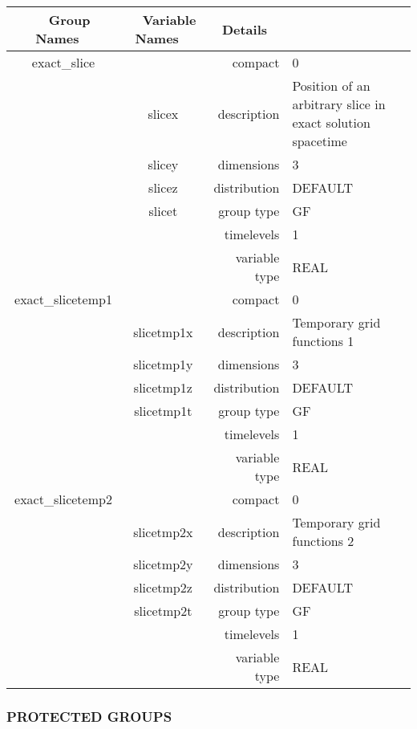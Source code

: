 \begin{tabular*}{150mm}{|c|c@{\extracolsep{\fill}}|rl|} \hline 
~ {\bf Group Names} ~ & ~ {\bf Variable Names} ~  &{\bf Details} ~ & ~\\ 
\hline 
exact\_slice &  & compact & 0 \\ 
 & slicex & description & Position of an arbitrary slice in exact solution spacetime \\ 
 & slicey & dimensions & 3 \\ 
 & slicez & distribution & DEFAULT \\ 
 & slicet & group type & GF \\ 
 &  & timelevels & 1 \\ 
 &  & variable type & REAL \\ 
\hline 
exact\_slicetemp1 &  & compact & 0 \\ 
 & slicetmp1x & description & Temporary grid functions 1 \\ 
 & slicetmp1y & dimensions & 3 \\ 
 & slicetmp1z & distribution & DEFAULT \\ 
 & slicetmp1t & group type & GF \\ 
 &  & timelevels & 1 \\ 
 &  & variable type & REAL \\ 
\hline 
exact\_slicetemp2 &  & compact & 0 \\ 
 & slicetmp2x & description & Temporary grid functions 2 \\ 
 & slicetmp2y & dimensions & 3 \\ 
 & slicetmp2z & distribution & DEFAULT \\ 
 & slicetmp2t & group type & GF \\ 
 &  & timelevels & 1 \\ 
 &  & variable type & REAL \\ 
\hline 
\end{tabular*} 


\vspace{5mm}\subsubsection{PROTECTED GROUPS}

\vspace{5mm}


